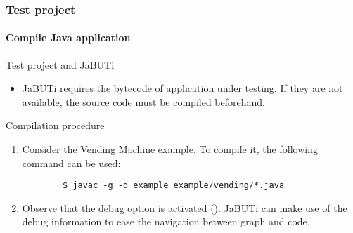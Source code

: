 \begin{frame}[parent={cmap:jabuti-test-project},hasnext=true,hasprev=true,fragile]
\frametitle{Test project}
\framesubtitle{Compile Java application}
\label{procedure:compile-java-application}

\begin{block:fact}{Test project and JaBUTi}
\begin{itemize}
	\item<1-> JaBUTi requires the bytecode of application under testing. If
	they are not available, the source code must be compiled beforehand.
\end{itemize}
\end{block:fact}

\begin{block:procedure}{Compilation procedure}
\begin{enumerate}
	\item<2-> Consider the Vending Machine example. To compile it, the following
	command can be used:

	\begin{lstlisting}
		$ javac -g -d example example/vending/*.java
	\end{lstlisting}

	\item<3-> Observe that the debug option is activated (). JaBUTi
	can make use of the debug information to ease the navigation between
	graph and code.
\end{enumerate}
\end{block:procedure}

\end{frame}